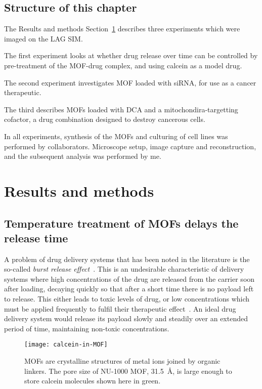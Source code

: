 \subsection{Structure of this chapter}
The Results and methods Section~\ref{sec:mofmethods} describes three experiments which were imaged on the LAG SIM. 

The first experiment looks at whether drug release over time can be controlled by pre-treatment of the MOF-drug complex, and using calcein as a model drug. 

The second experiment investigates MOF loaded with siRNA, for use as a cancer therapeutic.
 
The third describes MOFs loaded with DCA and a mitochondira-targetting cofactor, a drug combination designed to destroy cancerous cells. 

In all experiments, synthesis of the MOFs and culturing of cell lines was performed by collaborators. 
Microscope setup, image capture and reconstruction, and the subsequent analysis was performed by me. 

\section{Results and methods} \label{sec:mofmethods}

\subsection{Temperature treatment of MOFs delays the release time} \label{sec:mof-temperature}
A problem of drug delivery systems that has been noted in the literature is the so-called \textit{burst release effect}~\cite{huang2001importance, }.
This is an undesirable characteristic of delivery systems where high concentrations of the drug are released from the carrier soon after loading, decaying quickly so that after a short time there is no payload left to release. 
This either leads to toxic levels of drug, or low concentrations which must be applied frequently to fulfil their therapeutic effect~\cite{fu2010drug}. 
An ideal drug delivery system would release its payload slowly and steadily over an extended period of time, maintaining non-toxic concentrations. 

\begin{figure}[htbp!]
\centering
\texttt{[image: calcein-in-MOF]}
\caption[MOFs: The NU-1000 MOF has a large pore size to store other molecules]{MOFs are crystalline structures of metal ions joined by organic linkers. The pore size of NU-1000 MOF, \SI{31.5}{\angstrom}, is large enough to store calcein molecules shown here in green.}
\label{fig:calcein-in-MOF}
\end{figure}

